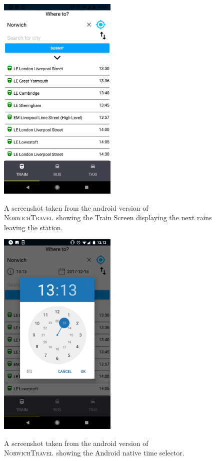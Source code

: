\documentclass[cmpstyle]{ueacmpstyle}
\newcommand{\nt}{\textsc{NorwichTravel}}
\begin{document}
		\begin{figure}[h]
			\centering
			\includegraphics[height=10cm]{images/android-train-2.png}\\
			\caption{A screenshot taken from the android version of \nt \ showing the Train Screen displaying the next rains leaving the station.}\label{fig:android-train-2}
		\end{figure}
		\begin{figure}
			\centering
			\includegraphics[height=10cm]{images/android-time.png}\\
			\caption{A screenshot taken from the android version of \nt \ showing the Android native time selector.}\label{fig:android-time}
		\end{figure}
\end{document}
